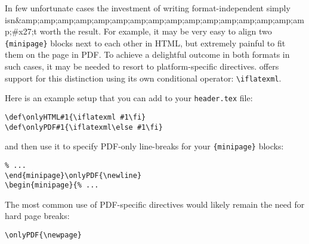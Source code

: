 
In few unfortunate cases the investment of writing format-independent \latex simply isn&amp;amp;amp;amp;amp;amp;amp;amp;amp;amp;amp;amp;amp;amp;amp;amp;#x27;t worth the result. For example, it may be very easy to align two \verb|{minipage}| blocks next to each other in HTML, but extremely painful to fit them on the page in PDF. To achieve a delightful outcome in both formats in such cases, it may be needed to resort to platform-specific directives. \latexml offers support for this distinction using its own conditional operator: \verb|\iflatexml|.

Here is an example setup that you can add to your \verb|header.tex| file:
\begin{lstlisting}
\def\onlyHTML#1{\iflatexml #1\fi}
\def\onlyPDF#1{\iflatexml\else #1\fi}
\end{lstlisting}

and then use it to specify PDF-only line-breaks for your \verb|{minipage}| blocks:
\begin{lstlisting}
% ...
\end{minipage}\onlyPDF{\newline}
\begin{minipage}{% ...
\end{lstlisting}

The most common use of PDF-specific directives would likely remain the need for hard page breaks:
\begin{lstlisting}
\onlyPDF{\newpage}
\end{lstlisting}